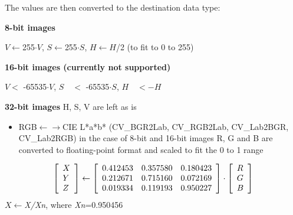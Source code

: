 \documentclass{article}
\begin{document}
The values are then converted to the destination data type:

\textbf{8-bit images}

$V\leftarrow $255$\cdot V$, $S\leftarrow $255$\cdot S$, $H\leftarrow H$/2 (to fit
to 0 to 255)

\textbf{16-bit images (currently not supported)}

$V <$ -65535$\cdot V$, $S \quad <$ -65535$\cdot S$, $H \quad <-H$

\textbf{32-bit images }H, S, V are left as is

\begin{itemize}
\item RGB$\leftarrow \to $CIE L*a*b* (CV{\_}BGR2Lab, CV{\_}RGB2Lab, CV{\_}Lab2BGR, CV{\_}Lab2RGB) in the case of 8-bit and 16-bit images R, G and B are converted to floating-point format and scaled to fit the 0 to 1 range
\end{itemize}
\[
\left[ {{\begin{array}{*{20}c}
 X \hfill \\
 Y \hfill \\
 Z \hfill \\
\end{array} }} \right]\leftarrow \left[ {{\begin{array}{*{20}c}
 {0.412453} \hfill & {0.357580} \hfill & {0.180423} \hfill \\
 {0.212671} \hfill & {0.715160} \hfill & {0.072169} \hfill \\
 {0.019334} \hfill & {0.119193} \hfill & {0.950227} \hfill \\
\end{array} }} \right]\cdot \left[ {{\begin{array}{*{20}c}
 R \hfill \\
 G \hfill \\
 B \hfill \\
\end{array} }} \right]
\]
$X\leftarrow $\textit{X/Xn}, where \textit{Xn}=0.950456
\end{document}
